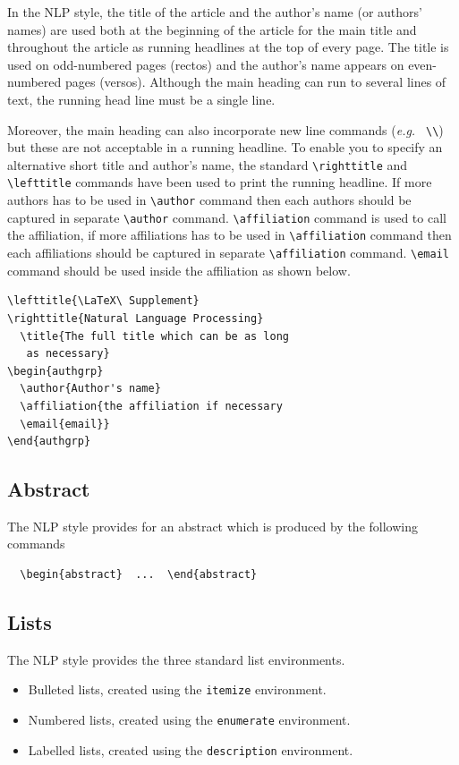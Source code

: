 \documentclass{CUP-JNL-NLP}
\begin{document}
In the NLP style, the title of the article and the author's name (or authors'
names) are used both at the beginning of the article for the main title and
throughout the article as running headlines at the top of every page.
The title is used on odd-numbered pages (rectos) and the author's name appears
on even-numbered pages (versos).
Although the main heading can run to several lines of text, the running head
line must be a single line.

Moreover, the main heading can also incorporate new line commands
({\it e.g.\ } \verb"\\") but these are not acceptable in a running headline.
To enable you to specify an alternative short title and author's name, the
standard \verb"\righttitle" and \verb"\lefttitle" commands have been used to print the running headline. If more authors has to be used in \verb"\author" command then each authors should be captured in separate \verb"\author" command.
\verb"\affiliation" command is used to call the affiliation, if more affiliations has to be used in \verb"\affiliation" command then each affiliations should be captured in separate \verb"\affiliation" command.
\verb"\email" command should be used inside the affiliation as shown below.
%
\begin{verbatim}
\lefttitle{\LaTeX\ Supplement}
\righttitle{Natural Language Processing}
  \title{The full title which can be as long
   as necessary}
\begin{authgrp}
  \author{Author's name}
  \affiliation{the affiliation if necessary
  \email{email}}
\end{authgrp}
\end{verbatim}
%

\subsection{Abstract}

The NLP style provides for an abstract which is produced by the following
commands
%
\begin{verbatim}
  \begin{abstract}  ...  \end{abstract}
\end{verbatim}

\subsection{Lists}

The NLP style provides the three standard list environments.
\begin{itemize}
  \item Bulleted lists, created using the \verb"itemize" environment.
  \item Numbered lists, created using the \verb"enumerate" environment.
  \item Labelled lists, created using the \verb"description" environment.
\end{itemize}
\end{document}
